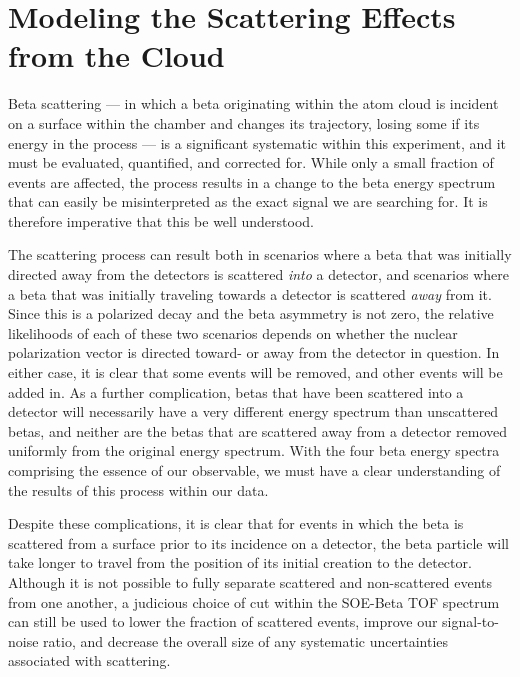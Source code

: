\FloatBarrier
\section{Modeling the Scattering Effects from the Cloud}
\label{sec:bs}

	Beta scattering --- in which a beta originating within the atom cloud is incident on a surface within the chamber and changes its trajectory, losing some if its energy in the process --- is a significant systematic within this experiment, and it must be evaluated, quantified, and corrected for.  While only a small fraction of events are affected, the process results in a change to the beta energy spectrum that can easily be misinterpreted as the exact signal we are searching for.  It is therefore imperative that this be well understood. 

The scattering process can result both in scenarios where a beta that was initially directed away from the detectors is scattered \emph{into} a detector, and scenarios where a beta that was initially traveling towards a detector is scattered \emph{away} from it. Since this is a polarized decay and the beta asymmetry is not zero, the relative likelihoods of each of these two scenarios depends on whether the nuclear polarization vector is directed toward- or away from the detector in question.  In either case, it is clear that some events will be removed, and other events will be added in.  As a further complication, betas that have been scattered into a detector will necessarily have a very different energy spectrum than unscattered betas, and neither are the betas that are scattered away from a detector removed uniformly from the original energy spectrum.  With the four beta energy spectra comprising the essence of our observable, we must have a clear understanding of the results of this process within our data.

Despite these complications, it is clear that for events in which the beta is scattered from a surface prior to its incidence on a detector, the beta particle will take longer to travel from the position of its initial creation to the detector.  Although it is not possible to fully separate scattered and non-scattered events from one another, a judicious choice of cut within the SOE-Beta TOF spectrum can still be used to lower the fraction of scattered events, improve our signal-to-noise ratio, and decrease the overall size of any systematic uncertainties associated with scattering.


